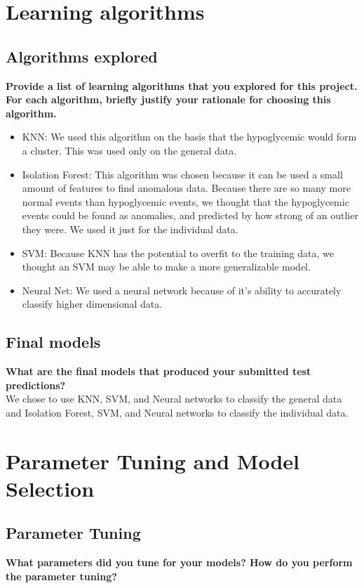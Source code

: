 \documentclass[11pt,a4paper]{article}
\begin{document}
\section{Learning algorithms}
\subsection{Algorithms explored}
\textbf{Provide a list of learning algorithms that you explored for this project. For each algorithm, briefly justify your rationale for choosing this algorithm.}\\
\begin{itemize}
  \item KNN: We used this algorithm on the basis that the hypoglycemic would form a cluster.
  This was used only on the general data.
  \item Isolation Forest: This algorithm was chosen because it can be used a small amount of features to find anomalous data.
  Because there are so many more normal events than hypoglycemic events, we thought that the hypoglycemic events could be found as anomalies, and predicted by how strong of an outlier they were.  We used it just for the individual data.
  \item SVM: Because KNN has the potential to overfit to the training data, we thought an SVM may be able to make a more generalizable model.
  \item Neural Net: We used a neural network because of it's ability to accurately classify higher dimensional data.
\end{itemize}

\subsection{Final models}
\textbf{What are the final models that produced your submitted test predictions?}\\
We chose to use KNN, SVM, and Neural networks to classify the general data and Isolation Forest, SVM, and Neural networks to classify the individual data.

\section{Parameter Tuning and Model Selection }
\subsection{Parameter Tuning}
\textbf{What parameters did you tune for your models? How do you perform the parameter tuning?}\\
\end{document}
